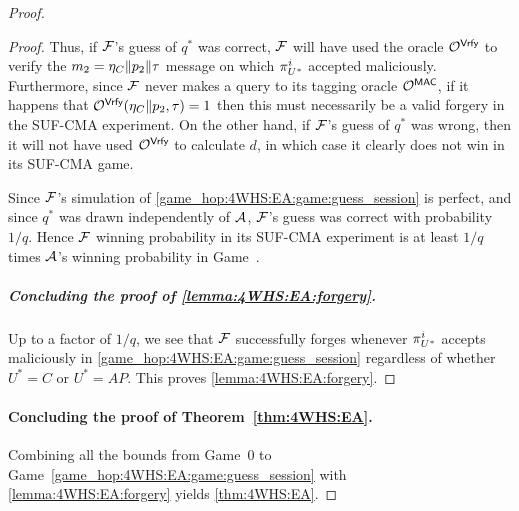 \begin{proof}
\begin{proof}
Thus, 
if $\A[F]$'s guess of $q^*$ was correct,
$\A[F]$ will have used the oracle $\mathcal{O}^{\macvrfy}$ to verify the $m_2 = \nonce_{C} \concat p_2 \concat \tau$ message on which $\eatarget$ accepted maliciously.
Furthermore,
since $\A[F]$ never makes a query to its tagging oracle $\mathcal{O}^{\mactag}$,
if it happens that $\mathcal{O}^{\macvrfy}(\nonce_{C} \concat p_2, \tau) = 1$ then this must necessarily be a valid forgery in the SUF-CMA experiment.
On the other hand,
if $\A[F]$'s guess of $q^*$ was wrong,
then it will not have used $\mathcal{O}^{\macvrfy}$ to calculate $d$,
in which case it clearly does not win in its SUF-CMA game.

Since $\A[F]$'s simulation of \cref{game_hop:4WHS:EA:game:guess_session} is perfect,
and since $q^*$ was drawn independently of $\A$,
$\A[F]$'s guess was correct with probability $1 / q$.
Hence $\A[F]$ winning probability in its SUF-CMA experiment is at least $1 / q$ times  $\A$'s winning probability in Game~\game{}.
 


\subparagraph{Concluding the proof of \cref{lemma:4WHS:EA:forgery}.}

Up to a factor of $1 / q$,
we see that $\A[F]$ successfully forges whenever $\eatarget$ accepts maliciously in \cref{game_hop:4WHS:EA:game:guess_session} regardless of whether $U^* = C$ or $U^* = AP$.
This proves \cref{lemma:4WHS:EA:forgery}. 
\end{proof}


\paragraph{Concluding the proof of Theorem~\ref{thm:4WHS:EA}.}

Combining all the bounds from Game~0 to Game~\ref{game_hop:4WHS:EA:game:guess_session} with \cref{lemma:4WHS:EA:forgery} yields \cref{thm:4WHS:EA}.
\end{proof} %
 



